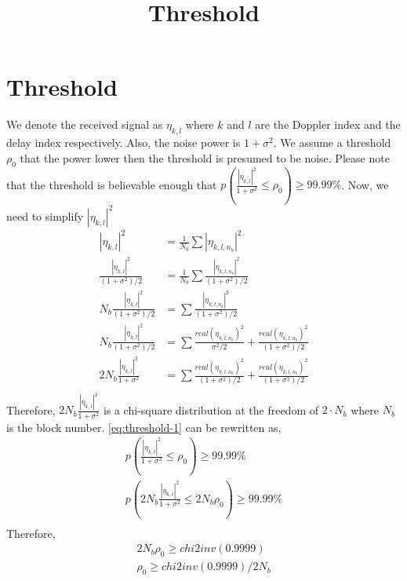 \documentclass{article}
\title{Threshold}
\author{}
\date{}
\begin{document}
\maketitle

\section*{Threshold}
We denote the received signal as $\eta_{k,l}$ where $k$ and $l$ are the Doppler index and the delay index respectively. Also, the noise power is $1+\sigma^2$. We assume a threshold $\rho_0$ that the power lower then the threshold is presumed to be noise. Please note that the threshold is believable enough that $p(\frac{|\eta_{k,l}|^2}{1+\sigma^2} \leq \rho_0) \geq 99.99\%$.
Now, we need to simplify $|\eta_{k,l}|^2$
\begin{equation}
\begin{split}
|\eta_{k,l}|^2 &= \frac{1}{N_b}\sum |\eta_{k,l,n_b}|^2 \\
\frac{|\eta_{k,l}|^2 }{(1+\sigma^2)/2} &= \frac{1}{N_b}\sum \frac{|\eta_{k,l,n_b}|^2 }{(1+\sigma^2)/2}\\
N_b\frac{|\eta_{k,l}|^2 }{(1+\sigma^2)/2} &= \sum \frac{|\eta_{k,l,n_b}|^2 }{(1+\sigma^2)/2}\\
N_b\frac{|\eta_{k,l}|^2 }{(1+\sigma^2)/2} &= \sum \frac{real(\eta_{k,l,n_b})^2 }{\sigma^2/2} + \frac{real(\eta_{k,l,n_b})^2 }{(1+\sigma^2)/2}\\ 
2N_b\frac{|\eta_{k,l}|^2 }{1+\sigma^2} &= \sum \frac{real(\eta_{k,l,n_b})^2 }{(1+\sigma^2)/2} + \frac{real(\eta_{k,l,n_b})^2 }{(1+\sigma^2)/2}\\ 
\end{split}
\label{eq:threshold-1}
\end{equation}
Therefore, $2N_b\frac{|\eta_{k,l}|^2 }{1+\sigma^2}$ is a chi-square distribution at the freedom of $2\cdot N_b$ where $N_b$ is the block number. \eqref{eq:threshold-1} can be rewritten as,
\begin{equation}
\begin{split}
p(\frac{|\eta_{k,l}|^2}{1+\sigma^2} \leq \rho_0) \geq 99.99\% \\
p(2N_b\frac{|\eta_{k,l}|^2}{1+\sigma^2} \leq 2N_b\rho_0) \geq 99.99\% \\
\end{split}
\end{equation}
Therefore, 
\begin{equation}
\begin{split}
2N_b\rho_0 \geq chi2inv(0.9999)\\
\rho_0 \geq chi2inv(0.9999)/2N_b
\end{split}
\end{equation}
\end{document}
